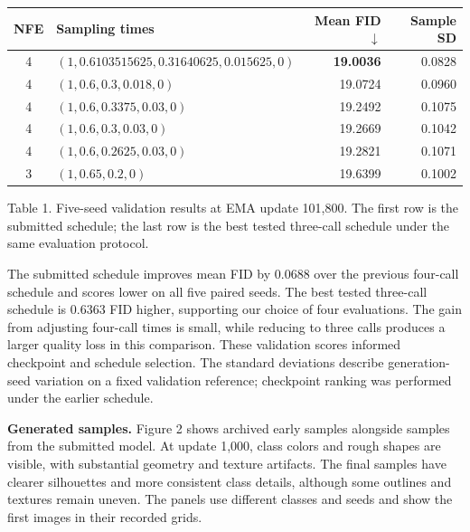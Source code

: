\documentclass[10pt,a4paper]{article}
\begin{document}
\begin{center}
{\small
\begin{tabular}{clrr}
\toprule
NFE & Sampling times & Mean FID $\downarrow$ & Sample SD\\
\midrule
4 & $(1,0.6103515625,0.31640625,0.015625,0)$ & \textbf{19.0036} & 0.0828\\
4 & $(1,0.6,0.3,0.018,0)$ & 19.0724 & 0.0960\\
4 & $(1,0.6,0.3375,0.03,0)$ & 19.2492 & 0.1075\\
4 & $(1,0.6,0.3,0.03,0)$ & 19.2669 & 0.1042\\
4 & $(1,0.6,0.2625,0.03,0)$ & 19.2821 & 0.1071\\
\midrule
3 & $(1,0.65,0.2,0)$ & 19.6399 & 0.1002\\
\bottomrule
\end{tabular}}\par
{\footnotesize Table 1. Five-seed validation results at EMA update 101,800. The first row is the submitted schedule; the last row is the best tested three-call schedule under the same evaluation protocol.}
\end{center}

The submitted schedule improves mean FID by 0.0688 over the previous four-call schedule and scores lower on all five paired seeds. The best tested three-call schedule is 0.6363 FID higher, supporting our choice of four evaluations. The gain from adjusting four-call times is small, while reducing to three calls produces a larger quality loss in this comparison. These validation scores informed checkpoint and schedule selection. The standard deviations describe generation-seed variation on a fixed validation reference; checkpoint ranking was performed under the earlier schedule.

\textbf{Generated samples.} Figure 2 shows archived early samples alongside samples from the submitted model. At update 1,000, class colors and rough shapes are visible, with substantial geometry and texture artifacts. The final samples have clearer silhouettes and more consistent class details, although some outlines and textures remain uneven. The panels use different classes and seeds and show the first images in their recorded grids.
\end{document}

